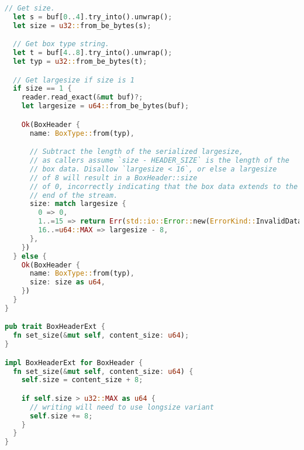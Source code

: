 \begin{lstlisting}[language=Rust]
  // Get size.
  let s = buf[0..4].try_into().unwrap();
  let size = u32::from_be_bytes(s);

  // Get box type string.
  let t = buf[4..8].try_into().unwrap();
  let typ = u32::from_be_bytes(t);

  // Get largesize if size is 1
  if size == 1 {
    reader.read_exact(&mut buf)?;
    let largesize = u64::from_be_bytes(buf);

    Ok(BoxHeader {
      name: BoxType::from(typ),

      // Subtract the length of the serialized largesize,
      // as callers assume `size - HEADER_SIZE` is the length of the
      // box data. Disallow `largesize < 16`, or else a largesize
      // of 8 will result in a BoxHeader::size
      // of 0, incorrectly indicating that the box data extends to the
      // end of the stream.
      size: match largesize {
        0 => 0,
        1..=15 => return Err(std::io::Error::new(ErrorKind::InvalidData, "64-bit box size too small")),
        16..=u64::MAX => largesize - 8,
      },
    })
  } else {
    Ok(BoxHeader {
      name: BoxType::from(typ),
      size: size as u64,
    })
  }
}

pub trait BoxHeaderExt {
  fn set_size(&mut self, content_size: u64);
}

impl BoxHeaderExt for BoxHeader {
  fn set_size(&mut self, content_size: u64) {
    self.size = content_size + 8;

    if self.size > u32::MAX as u64 {
      // writing will need to use longsize variant
      self.size += 8;
    }
  }
}
\end{lstlisting}

\pagebreak{}

